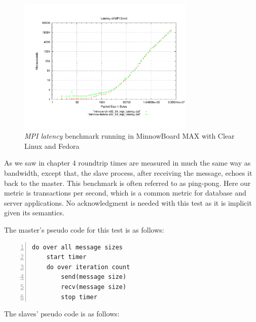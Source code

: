 \begin{figure}[H]
\centering
\includegraphics[width=0.75\textwidth]{images/mpbench_clr_experiments/mpi_latency.pdf}
\caption{\textit{MPI latency} benchmark running in  MinnowBoard MAX with Clear Linux and
Fedora }
\label{mpi_latency_clr_fedora}
\end{figure}



As we saw in chapter 4 roundtrip times are measured in much the same way as
bandwidth, except that, the slave process, after receiving the message, echoes
it back to the master.  This benchmark is often referred to as ping-pong. Here
our metric is transactions per second, which is a common metric for database
and server applications. No acknowledgment is needed with this test as it is
implicit given its semantics.

The master's pseudo code for this test is as follows:

\begin{minipage}{\textwidth}
\end{minipage}

\begin{minipage}{\textwidth}
\begin{lstlisting}[frame=single,numbers=left]
  do over all message sizes 
    start timer
    do over iteration count
        send(message size)
        recv(message size) 
        stop timer
\end{lstlisting}

\end{minipage}

The slaves' pseudo code is as follows:

\begin{minipage}{\textwidth}
\end{minipage}

